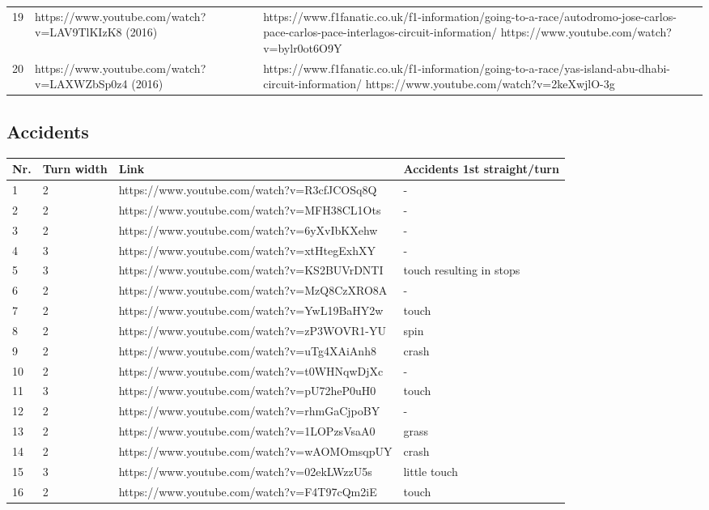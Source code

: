 \documentclass{article}
\begin{document}
\begin{tabularx}{.6\textwidth}{Xll}
19 & https://www.youtube.com/watch?v=LAV9TlKIzK8 (2016) & https://www.f1fanatic.co.uk/f1-information/going-to-a-race/autodromo-jose-carlos-pace-carlos-pace-interlagos-circuit-information/ https://www.youtube.com/watch?v=bylr0ot6O9Y \\
20 & https://www.youtube.com/watch?v=LAXWZbSp0z4 (2016) & https://www.f1fanatic.co.uk/f1-information/going-to-a-race/yas-island-abu-dhabi-circuit-information/ https://www.youtube.com/watch?v=2keXwjlO-3g \\
\end{tabularx}

\subsection{Accidents}
\begin{tabular}{llll}
Nr.	& Turn width & Link & Accidents 1st straight/turn \\
\hline
1 & 2 &  https://www.youtube.com/watch?v=R3cfJCOSq8Q & - \\
2 & 2 &  https://www.youtube.com/watch?v=MFH38CL1Ots & - \\
3 & 2 &  https://www.youtube.com/watch?v=6yXvIbKXehw & - \\
4 & 3 &  https://www.youtube.com/watch?v=xtHtegExhXY & - \\
5 & 3 &  https://www.youtube.com/watch?v=KS2BUVrDNTI & touch resulting in stops \\
6 & 2 &  https://www.youtube.com/watch?v=MzQ8CzXRO8A & - \\
7 & 2 &  https://www.youtube.com/watch?v=YwL19BaHY2w & touch \\
8 & 2 &  https://www.youtube.com/watch?v=zP3WOVR1-YU & spin \\
9 & 2 &  https://www.youtube.com/watch?v=uTg4XAiAnh8 & crash \\
10 & 2 &  https://www.youtube.com/watch?v=t0WHNqwDjXc & - \\
11 & 3 &  https://www.youtube.com/watch?v=pU72heP0uH0 & touch \\
12 & 2 &  https://www.youtube.com/watch?v=rhmGaCjpoBY & - \\
13 & 2 &  https://www.youtube.com/watch?v=1LOPzsVsaA0 & grass \\
14 & 2 &  https://www.youtube.com/watch?v=wAOMOmsqpUY & crash \\
15 & 3 &  https://www.youtube.com/watch?v=02ekLWzzU5s & little touch \\
16 & 2 &  https://www.youtube.com/watch?v=F4T97cQm2iE & touch \\
\end{tabular}
\end{document}
